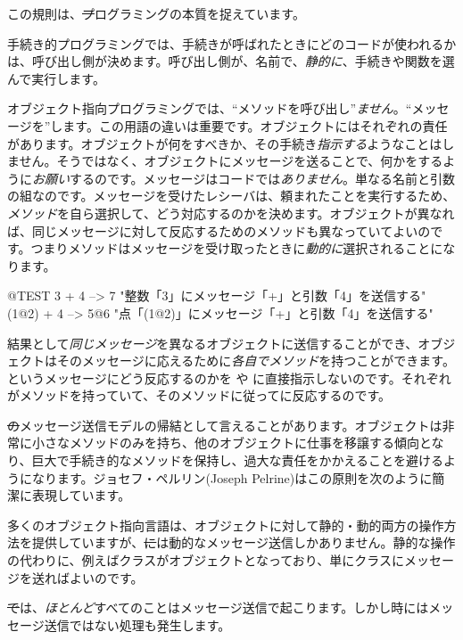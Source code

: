 \documentclass[a4paper,10pt,twoside]{book}
\begin{document}
この規則は、\st プログラミングの本質を捉えています。

手続き的プログラミングでは、手続きが呼ばれたときにどのコードが使われるかは、呼び出し側が決めます。呼び出し側が、名前で、\emph{静的に}、手続きや関数を選んで実行します。

オブジェクト指向プログラミングでは、``メソッドを呼び出し''\emph{ません}。``メッセージを''します。この用語の違いは重要です。オブジェクトにはそれぞれの責任があります。オブジェクトが何をすべきか、その手続き\emph{指示する}ようなことはしません。そうではなく、オブジェクトにメッセージを送ることで、何かをするように\emph{お願い}するのです。メッセージはコードでは\emph{ありません}。単なる名前と引数の組なのです。メッセージを受けたレシーバは、頼まれたことを実行するため、\emph{メソッド}を自ら選択して、どう対応するのかを決めます。オブジェクトが異なれば、同じメッセージに対して反応するためのメソッドも異なっていてよいのです。つまりメソッドはメッセージを受け取ったときに\emph{動的に}選択されることになります。

\begin{code}{@TEST}
3 + 4         --> 7          "整数「3」にメッセージ「+」と引数「4」を送信する"
(1@2) + 4 --> 5@6    "点「(1@2)」にメッセージ「+」と引数「4」を送信する"
\end{code}

\noindent
結果として\emph{同じメッセージ}を異なるオブジェクトに送信することができ、オブジェクトはそのメッセージに応えるために\emph{各自でメソッド}を持つことができます。というメッセージにどう反応するのかを や に直接指示しないのです。それぞれが\ct{+}メソッドを持っていて、そのメソッドに従ってに反応するのです。

\st のメッセージ送信モデルの帰結として言えることがあります。オブジェクトは非常に小さなメソッドのみを持ち、他のオブジェクトに仕事を移譲する傾向となり、巨大で手続き的なメソッドを保持し、過大な責任をかかえることを避けるようになります。ジョセフ・ペルリン(Joseph Pelrine)はこの原則を次のように簡潔に表現しています。

多くのオブジェクト指向言語は、オブジェクトに対して静的・動的両方の操作方法を提供していますが、\st には動的なメッセージ送信しかありません。静的な操作の代わりに、例えばクラスがオブジェクトとなっており、単にクラスにメッセージを送ればよいのです。

\st では、\emph{ほとんど}すべてのことはメッセージ送信で起こります。しかし時にはメッセージ送信ではない処理も発生します。
\end{document}
